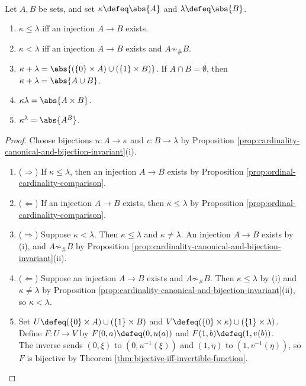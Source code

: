 \begin{proposition} \label{prop:cardinal-operations-on-representatives} \\
Let $A,B$ be sets, and set $\kappa\defeq\abs{A}$ and $\lambda\defeq\abs{B}$.
\begin{enumerate}[label=(\roman*)]
\setlength{\itemsep}{0pt}
\item $\kappa\leq\lambda$ iff an injection $A\to B$ exists.
\item $\kappa<\lambda$ iff an injection $A\to B$ exists and $A\not\sim_{\#}B$.
\item $\kappa+\lambda=\abs{(\{0\}\times A)\cup(\{1\}\times B)}$. If $A\cap B=\emptyset$, then $\kappa+\lambda=\abs{A\cup B}$.
\item $\kappa\lambda=\abs{A\times B}$.
\item $\kappa^\lambda=\abs{A^B}$.
\end{enumerate}
\begin{proof}
Choose bijections $u:A\to\kappa$ and $v:B\to\lambda$ by Proposition \ref{prop:cardinality-canonical-and-bijection-invariant}(i).
\begin{enumerate}[label=(\roman*)]
\setlength{\itemsep}{0pt}
\item[$(i)$] ($\Rightarrow$) If $\kappa\leq\lambda$, then an injection $A\to B$ exists by Proposition \ref{prop:ordinal-cardinality-comparison}.
\item[$(i)$] ($\Leftarrow$) If an injection $A\to B$ exists, then $\kappa\leq\lambda$ by Proposition \ref{prop:ordinal-cardinality-comparison}.
\item[$(ii)$] ($\Rightarrow$) Suppose $\kappa<\lambda$. Then $\kappa\leq\lambda$ and $\kappa\neq\lambda$. An injection $A\to B$ exists by (i), and $A\not\sim_{\#}B$ by Proposition \ref{prop:cardinality-canonical-and-bijection-invariant}(ii).
\item[$(ii)$] ($\Leftarrow$) Suppose an injection $A\to B$ exists and $A\not\sim_{\#}B$. Then $\kappa\leq\lambda$ by (i) and $\kappa\neq\lambda$ by Proposition \ref{prop:cardinality-canonical-and-bijection-invariant}(ii), so $\kappa<\lambda$.
\item[$(iii)$] Set $U\defeq(\{0\}\times A)\cup(\{1\}\times B)$ and $V\defeq(\{0\}\times\kappa)\cup(\{1\}\times\lambda)$. Define $F:U\to V$ by $F(0,a)\defeq(0,u(a))$ and $F(1,b)\defeq(1,v(b))$.\\
The inverse sends $(0,\xi)$ to $(0,u^{-1}(\xi))$ and $(1,\eta)$ to $(1,v^{-1}(\eta))$, so $F$ is bijective by Theorem \ref{thm:bijective-iff-invertible-function}.\\

\end{enumerate}
\end{proof}
\end{proposition}
